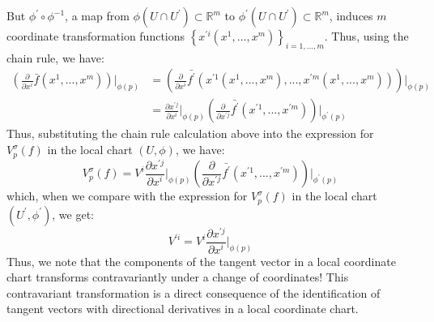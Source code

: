       But $\phi^{\prime} \circ \phi^{-1}$, a map from $\phi(U\cap U^\prime)
      \subset \mathbb{R}^m$ to $\phi^\prime(U\cap U^\prime) \subset
      \mathbb{R}^m$, induces $m$ coordinate transformation functions
      $\left\{x^{\prime i}(x^1,...,x^m)\right\}_{i=1,...,m}$. Thus, using the chain rule, we have:
      \begin{align*}
        \left(\frac{\partial}{\partial x^i}
        \bar{f}(x^1,...,x^m)\right)\Bigr|_{\phi(p)} 
        &= \left(\frac{\partial}{\partial x^i} \bar{f^\prime}(x^{\prime
        1}(x^1,...,x^m),...,x^{\prime m}(x^1,...,x^m))\right)
        \Bigr|_{\phi(p)}\\
        &= \frac{\partial x^{\prime j}}{\partial x^i}\Bigr|_{\phi(p)}
        \left(\frac{\partial }{\partial x^{\prime
        j}}\bar{f^\prime}(x^{\prime 1},...,x^{\prime
        m})\right)\Bigr|_{\phi^\prime(p)}
      \end{align*}
      Thus, substituting the chain rule calculation above into the
      expression for $V_p^\sigma(f)$ in the local chart $(U,\phi)$, we
      have:
      \begin{equation*}
        V^\sigma_p(f) = V^i \frac{\partial x^{\prime j}}{\partial
          x^i}\Bigr|_{\phi(p)} \left(\frac{\partial }{\partial x^{\prime
          j}}\bar{f^\prime}(x^{\prime 1},...,x^{\prime
          m})\right)\Bigr|_{\phi^\prime(p)}
      \end{equation*}
      which, when we compare with the expression for $V_p^\sigma(f)$ in the
      local chart $(U^\prime,\phi^\prime)$, we get:
      \begin{equation}
        \label{eqn: Tangent vector component contravariant transformation}
        V^{\prime i} = V^i \frac{\partial x^{\prime j}}{\partial
        x^i}\Bigr|_{\phi(p)}
      \end{equation}
      Thus, we note that the components of the tangent vector in a local
      coordinate chart transforms contravariantly under a change of
      coordinates! This contravariant transformation is a direct
      consequence of the identification of tangent vectors with directional
      derivatives in a local coordinate chart.
